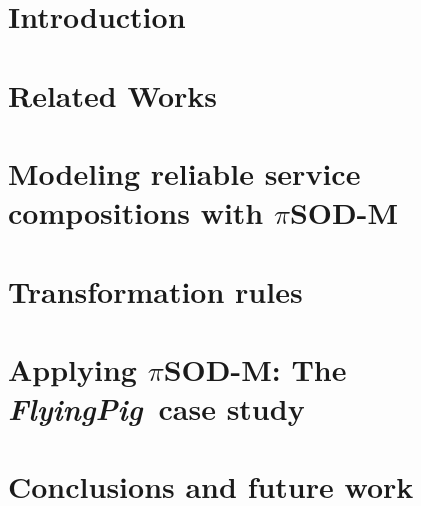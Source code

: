 \documentclass{ws-ijseke}
\newcommand{\pisodm}[0]{$\pi$SOD-M\xspace}
\def\FlyingPig{\textsl{FlyingPig}}
\begin{document}
\begin{abstract}
Specifying non-functional requirements (NFRs) is a complex task, being usually dealt with on the later phases of the software process.
The late inclusion of NFRs in the development may compromise the quality of the deployed application.
This paper presents \pisodm, a method and associated tools that
\textit{(i)}  allows the early specification of non-functional requirements in a principled way: users are abstracted away from low level details;
\textit{(ii)} embraces the MDA philosophy, generating models (code) whenever possible.
The pro\-po\-sed solution has been utilized in the context of an industrial and real case study.
\end{abstract}



\section{Introduction}
\label{sec:intro}


\section{Related Works}
\label{sec:relworks}


\section{Modeling reliable service compositions with \pisodm}\label{sec:motivation}


\section{Transformation rules}\label{sec:mmrules}


\section{Applying \pisodm: The \FlyingPig\ case study}
\label{sec:flyingPig}



\section{Conclusions and future work}\label{sec:conclusions}





\end{document}
